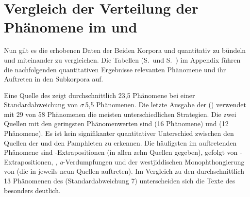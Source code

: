 \section{Vergleich der Verteilung der Phänomene im  und }\label{phaenomene}%
Nun gilt es die erhobenen Daten der Beiden Korpora  und  quantitativ zu bündeln und miteinander zu vergleichen. Die Tabellen (S.\, \pageref{appendixphaenall} und S.\, \pageref{appendixphaenalljuedliji}) im Appendix führen die nachfolgenden quantitativen Ergebnisse relevanten Phänomene und ihr Auftreten in den Subkorpora auf. 

Eine Quelle des  zeigt durchschnittlich 23,5 Phänomene bei einer Standardabweichung von $\sigma$\,5,5 Phänomenen. Die letzte Ausgabe der  () verwendet mit 29 von 58 Phänomenen die meisten unterschiedlichen Strategien. Die zwei Quellen mit den geringsten Phänomenwerten sind  (16 Phänomene) und  (12 Phänomene). Es ist kein signifikanter quantitativer Unterschied zwischen den Quellen der  und den Pamphleten zu erkennen. Die häufigsten im  auftretenden Phänomene sind \hai{{\NP}}-Extrapositionen (in allen zehn Quellen gegeben), gefolgt von \hai{{\PP}}-Extrapositionen, \hai{{\VR}}, \textit{a}-Verdumpfungen und der westjiddischen Monophthongierung von  (die in jeweils neun Quellen auftreten).
Im Vergleich zu den durchschnittlich 13 Phänomenen des  (Standardabweichung 7) unterscheiden sich die Texte des  besonders deutlich. 
	
